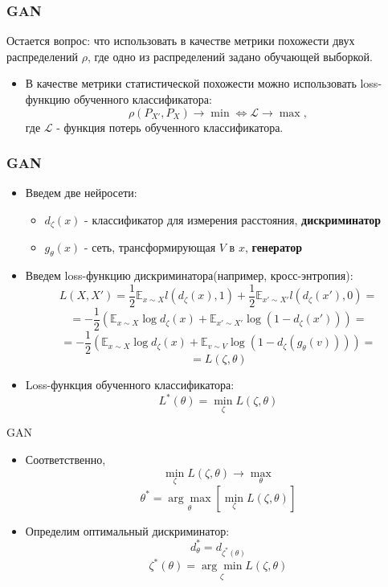 \documentclass[9pt]{beamer}
\begin{document}
\begin{frame}\frametitle{GAN}
	Остается вопрос: что использовать в качестве метрики похожести двух распределений $\rho$, где одно из распределений задано обучающей выборкой.
	\begin{itemize}
		\item В качестве метрики статистической похожести можно использовать loss-функцию обученного классификатора:
		$$ \rho(P_{X'}, P_X) \longrightarrow \min \Leftrightarrow \mathcal{L} \longrightarrow \max, $$
		где $\mathcal{L}$ - функция потерь обученного классификатора.
	\end{itemize}
\end{frame}

\begin{frame}\frametitle{GAN}
	\begin{itemize}
		\item Введем две нейросети:
		\begin{itemize}
			\item $d_{\zeta}(x)$ - классификатор для измерения расстояния, \textbf{дискриминатор}
			\item $g_{\theta}(x)$ - сеть, трансформирующая $V$ в $x$, \textbf{генератор}
		\end{itemize}
		\item Введем loss-функцию дискриминатора(например, кросс-энтропия):
		$$ L(X, X') = \frac{1}{2} \mathbb{E}_{x \sim X} l(d_{\zeta}(x), 1) + \frac{1}{2} \mathbb{E}_{x' \sim X'} l(d_{\zeta}(x'), 0) = $$
		 $$ = -\frac{1}{2} (\mathbb{E}_{x \sim X} \log d_{\zeta}(x) + \mathbb{E}_{x' \sim X'} \log (1 - d_{\zeta}(x'))) = $$
		 $$ =  -\frac{1}{2} (\mathbb{E}_{x \sim X} \log d_{\zeta}(x) + \mathbb{E}_{v \sim V} \log (1 - d_{\zeta}(g_{\theta}(v)))) = $$
		 $$ = L(\zeta, \theta) $$
		 \item Loss-функция обученного классификатора:
		 $$ L^*(\theta) = \underset{\zeta}{\min} L(\zeta, \theta) $$
	\end{itemize}
\end{frame}

\begin{frame}{GAN}
	\begin{itemize}
		\item Соответственно,
		 $$ \underset{\zeta}{\min} L(\zeta, \theta) \longrightarrow \underset{\theta}{\max} $$
		 $$ \theta^* = \underset{\theta}{\arg\max} \left[ \underset{\zeta}{\min} L(\zeta, \theta) \right] $$
		 \item Определим оптимальный дискриминатор:
		 $$ d^*_{\theta} = d_{\zeta^*(\theta)} $$
		 $$ \zeta^*(\theta) =  \underset{\zeta}{\arg\min} L(\zeta, \theta)$$
	\end{itemize}
\end{frame}
\end{document}
